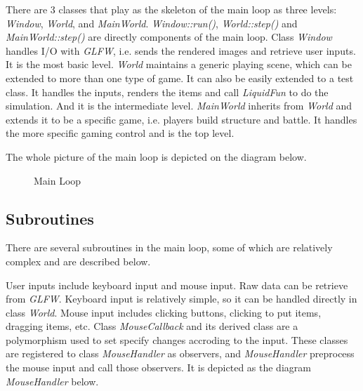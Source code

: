 \documentclass[UTF8]{ctexart}
\begin{document}
            There are 3 classes that play as the skeleton of the main loop as three levels: \textit{Window}, \textit{World}, and \textit{MainWorld}. \textit{Window::run()}, \textit{World::step()} and \textit{MainWorld::step()} are directly components of the main loop. Class \textit{Window} handles I/O with \textit{GLFW}, i.e. sends the rendered images and retrieve user inputs. It is the most basic level. \textit{World} maintains a generic playing scene, which can be extended to more than one type of game. It can also be easily extended to a test class. It handles the inputs, renders the items and call \textit{LiquidFun} to do the simulation. And it is the intermediate level. \textit{MainWorld} inherits from \textit{World} and extends it to be a specific game, i.e. players build structure and battle. It handles the more specific gaming control and is the top level.

            The whole picture of the main loop is depicted on the diagram below. 

            \begin{figure}[htp]
                \caption{Main Loop}
            \end{figure}

        \subsection{Subroutines}

            There are several subroutines in the main loop, some of which are relatively complex and are described below.

            User inputs include keyboard input and mouse input. Raw data can be retrieve from \textit{GLFW}. Keyboard input is relatively simple, so it can be handled directly in class \textit{World}. Mouse input includes clicking buttons, clicking to put items, dragging items, etc. Class \textit{MouseCallback} and its derived class are a polymorphism used to set specify changes accroding to the input. These classes are registered to class \textit{MouseHandler} as observers, and \textit{MouseHandler} preprocess the mouse input and call those observers. It is depicted as the diagram \textit{MouseHandler} below.
\end{document}
